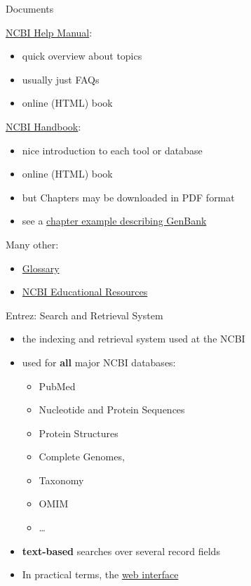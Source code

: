 \begin{frame}{Documents}

\href{http://www.ncbi.nlm.nih.gov/books/NBK3831/}{NCBI Help Manual}:

\begin{itemize}
\itemsep1pt\parskip0pt
\item
  quick overview about topics
\item
  usually just FAQs
\item
  online (HTML) book
\end{itemize}

\href{http://www.ncbi.nlm.nih.gov/books/NBK21101/}{NCBI Handbook}:

\begin{itemize}
\itemsep1pt\parskip0pt
\item
  nice introduction to each tool or database
\item
  online (HTML) book
\item
  but Chapters may be downloaded in PDF format
\item
  see a \href{http://www.ncbi.nlm.nih.gov/books/NBK21105/}{chapter
  example describing GenBank}
\end{itemize}

Many other:

\begin{itemize}
\itemsep1pt\parskip0pt
\item
  \href{http://www.ncbi.nlm.nih.gov/books/NBK21106/}{Glossary}
\item
  \href{http://www.ncbi.nlm.nih.gov/education/}{NCBI Educational
  Resources}
\end{itemize}

\end{frame}

\begin{frame}{Entrez: Search and Retrieval System}

\begin{itemize}
\itemsep1pt\parskip0pt
\item
  the indexing and retrieval system used at the NCBI
\item
  used for \textbf{all} major NCBI databases:

  \begin{itemize}
  \itemsep1pt\parskip0pt
  \item
    PubMed
  \item
    Nucleotide and Protein Sequences
  \item
    Protein Structures
  \item
    Complete Genomes,
  \item
    Taxonomy
  \item
    OMIM
  \item
    \ldots{}
  \end{itemize}
\item
  \textbf{text-based} searches over several record fields
\item
  In practical terms, the \href{http://www.ncbi.nlm.nih.gov/}{web
  interface}
\end{itemize}

\end{frame}

